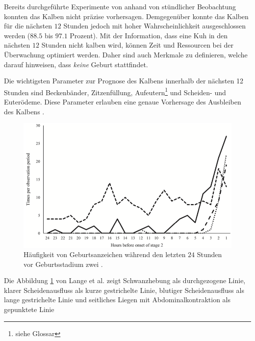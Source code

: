 Bereits durchgeführte Experimente von \citep[S. 1]{Lange2017} anhand von stündlicher Beobachtung konnten das Kalben nicht präzise vorhersagen. Demgegenüber konnte das Kalben für die nächsten $12$ Stunden jedoch mit hoher Wahrscheinlichkeit ausgeschlossen werden ($88.5$ bis $97.1$ Prozent). Mit der Information, dass eine Kuh in den nächsten $12$ Stunden nicht kalben wird, können Zeit und Ressourcen bei der Überwachung optimiert werden. Daher sind auch Merkmale zu definieren, welche darauf hinweisen, dass \textit{keine} Geburt stattfindet.

Die wichtigsten Parameter zur Prognose des Kalbens innerhalb der nächsten 12 Stunden sind Beckenbänder, Zitzenfüllung, \gls{Aufeutern}\footnote{\label{glossar-aufeutern}siehe Glossar} und Scheiden- und Euterödeme. Diese Parameter erlauben eine genaue Vorhersage des Ausbleiben des Kalbens \citep[S. 4]{Streyl2011}.



\begin{figure}[H]
	\center
	\includegraphics[scale=.45]{Grafiken/observationTimes.png}
	\caption{Häufigkeit von Geburtsanzeichen während den letzten $24$ Stunden vor Geburtsstadium zwei \citep[S.5]{Lange2017}.}
	\label{fig: Häufigkeit von Geburtsanzeichen }
\end{figure}

Die Abbildung \ref{fig: Häufigkeit von Geburtsanzeichen } von Lange et al. zeigt Schwanzhebung als durchgezogene Linie, klarer Scheidenausfluss als kurze gestrichelte Linie,  blutiger Scheidenausfluss als lange gestrichelte Linie und seitliches Liegen mit Abdominalkontraktion als gepunktete Linie
